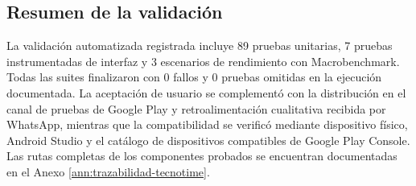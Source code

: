 \subsection{Resumen de la validación}
La validación automatizada registrada incluye 89 pruebas unitarias, 7 pruebas instrumentadas de interfaz y 3 escenarios de rendimiento con Macrobenchmark. Todas las suites finalizaron con 0 fallos y 0 pruebas omitidas en la ejecución documentada. La aceptación de usuario se complementó con la distribución en el canal de pruebas de Google Play y retroalimentación cualitativa recibida por WhatsApp, mientras que la compatibilidad se verificó mediante dispositivo físico, Android Studio y el catálogo de dispositivos compatibles de Google Play Console. Las rutas completas de los componentes probados se encuentran documentadas en el Anexo \ref{ann:trazabilidad-tecnotime}.

